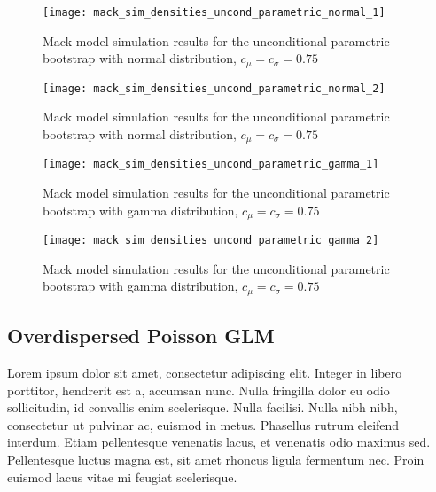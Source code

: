 \documentclass[a4paper]{book}
\begin{document}
\begin{landscape}
  \begin{figure}
    \centering
    \texttt{[image: mack\_sim\_densities\_uncond\_parametric\_normal\_1]}
    \caption{Mack model simulation results for the unconditional parametric bootstrap with normal distribution, $c_\mu = c_\sigma = 0.75$}
    \label{fig:mack-sim-uncond-param-normal}
  \end{figure}
\end{landscape}

\begin{landscape}
  \begin{figure}
    \ContinuedFloat
    \captionsetup{list=off,format=cont}
    \centering
    \texttt{[image: mack\_sim\_densities\_uncond\_parametric\_normal\_2]}
    \caption{Mack model simulation results for the unconditional parametric bootstrap with normal distribution, $c_\mu = c_\sigma = 0.75$}
  \end{figure}
\end{landscape}

\begin{landscape}
  \begin{figure}
    \centering
    \texttt{[image: mack\_sim\_densities\_uncond\_parametric\_gamma\_1]}
    \caption{Mack model simulation results for the unconditional parametric bootstrap with gamma distribution, $c_\mu = c_\sigma = 0.75$}
    \label{fig:mack-sim-uncond-param-gamma}
  \end{figure}
\end{landscape}

\begin{landscape}
  \begin{figure}
    \ContinuedFloat
    \captionsetup{list=off,format=cont}
    \centering
    \texttt{[image: mack\_sim\_densities\_uncond\_parametric\_gamma\_2]}
    \caption{Mack model simulation results for the unconditional parametric bootstrap with gamma distribution, $c_\mu = c_\sigma = 0.75$}
  \end{figure}
\end{landscape}

\restoregeometry

\subsection{Overdispersed Poisson GLM}

Lorem ipsum dolor sit amet, consectetur adipiscing elit. Integer in libero porttitor, hendrerit est a, accumsan nunc. Nulla fringilla dolor eu odio sollicitudin, id convallis enim scelerisque. Nulla facilisi. Nulla nibh nibh, consectetur ut pulvinar ac, euismod in metus. Phasellus rutrum eleifend interdum. Etiam pellentesque venenatis lacus, et venenatis odio maximus sed. Pellentesque luctus magna est, sit amet rhoncus ligula fermentum nec. Proin euismod lacus vitae mi feugiat scelerisque.
\end{document}
